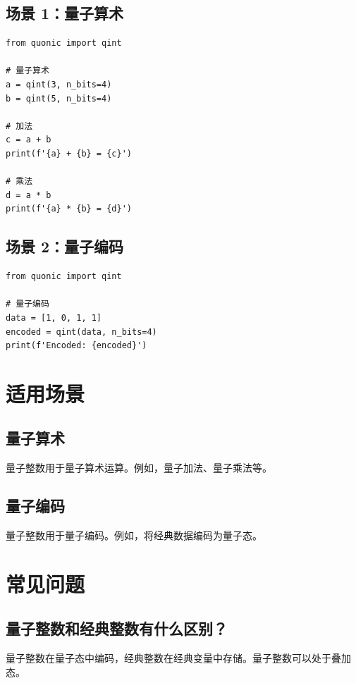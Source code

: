 \documentclass[12pt,a4paper]{article}
\begin{document}
\subsection{场景 1：量子算术}

\begin{verbatim}
from quonic import qint

# 量子算术
a = qint(3, n_bits=4)
b = qint(5, n_bits=4)

# 加法
c = a + b
print(f'{a} + {b} = {c}')

# 乘法
d = a * b
print(f'{a} * {b} = {d}')
\end{verbatim}

\subsection{场景 2：量子编码}

\begin{verbatim}
from quonic import qint

# 量子编码
data = [1, 0, 1, 1]
encoded = qint(data, n_bits=4)
print(f'Encoded: {encoded}')
\end{verbatim}

\section{适用场景}

\subsection{量子算术}

量子整数用于量子算术运算。例如，量子加法、量子乘法等。

\subsection{量子编码}

量子整数用于量子编码。例如，将经典数据编码为量子态。

\section{常见问题}

\subsection{量子整数和经典整数有什么区别？}

量子整数在量子态中编码，经典整数在经典变量中存储。量子整数可以处于叠加态。
\end{document}
